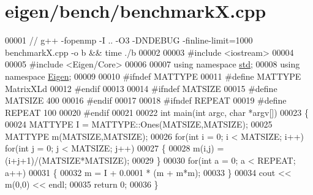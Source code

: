 \hypertarget{eigen_2bench_2benchmark_x_8cpp_source}{}\section{eigen/bench/benchmarkX.cpp}
\label{eigen_2bench_2benchmark_x_8cpp_source}

\begin{DoxyCode}
00001 \textcolor{comment}{// g++ -fopenmp -I .. -O3 -DNDEBUG -finline-limit=1000 benchmarkX.cpp -o b && time ./b}
00002 
00003 \textcolor{preprocessor}{#include <iostream>}
00004 
00005 \textcolor{preprocessor}{#include <Eigen/Core>}
00006 
00007 \textcolor{keyword}{using namespace }\hyperlink{namespacestd}{std};
00008 \textcolor{keyword}{using namespace }\hyperlink{namespace_eigen}{Eigen};
00009 
00010 \textcolor{preprocessor}{#ifndef MATTYPE}
00011 \textcolor{preprocessor}{#define MATTYPE MatrixXLd}
00012 \textcolor{preprocessor}{#endif}
00013 
00014 \textcolor{preprocessor}{#ifndef MATSIZE}
00015 \textcolor{preprocessor}{#define MATSIZE 400}
00016 \textcolor{preprocessor}{#endif}
00017 
00018 \textcolor{preprocessor}{#ifndef REPEAT}
00019 \textcolor{preprocessor}{#define REPEAT 100}
00020 \textcolor{preprocessor}{#endif}
00021 
00022 \textcolor{keywordtype}{int} main(\textcolor{keywordtype}{int} argc, \textcolor{keywordtype}{char} *argv[])
00023 \{
00024     MATTYPE I = MATTYPE::Ones(MATSIZE,MATSIZE);
00025     MATTYPE m(MATSIZE,MATSIZE);
00026     \textcolor{keywordflow}{for}(\textcolor{keywordtype}{int} i = 0; i < MATSIZE; i++) \textcolor{keywordflow}{for}(\textcolor{keywordtype}{int} j = 0; j < MATSIZE; j++)
00027     \{
00028         m(i,j) = (i+j+1)/(MATSIZE*MATSIZE);
00029     \}
00030     \textcolor{keywordflow}{for}(\textcolor{keywordtype}{int} a = 0; a < REPEAT; a++)
00031     \{
00032         m = I + 0.0001 * (m + m*m);
00033     \}
00034     cout << m(0,0) << endl;
00035     \textcolor{keywordflow}{return} 0;
00036 \}
\end{DoxyCode}
